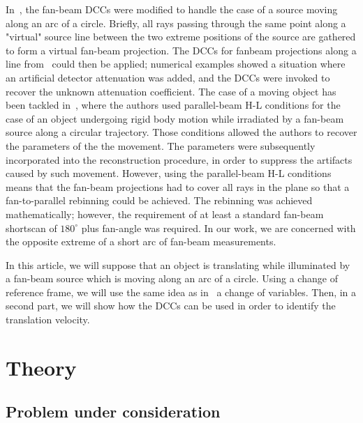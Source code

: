 \documentclass[twocolumn]{IEEEtran}
\begin{document}
In~\cite{clackdoyle2015consistency}, the fan-beam DCCs were modified to handle the case of a source moving along an arc of a circle. Briefly, all rays passing through the same point along a "virtual" source line between the two extreme positions of the source are gathered to form a virtual fan-beam projection. The DCCs for fanbeam projections along a line from~\cite{clackdoyle2013necessary} could then be applied; numerical examples showed a situation where an artificial detector attenuation was added, and the DCCs were invoked to recover the unknown attenuation coefficient. The case of a moving object has been tackled in~\cite{yu2006data,yu2007data}, where the authors used parallel-beam H-L conditions for the case of an object undergoing rigid body motion while irradiated by a fan-beam source along a circular trajectory. Those conditions allowed the authors to recover the parameters of the the movement. The parameters were subsequently incorporated into the reconstruction procedure, in order to suppress the artifacts caused by such movement.  However, using the parallel-beam H-L conditions means that the fan-beam projections had to cover all rays in the plane so that a fan-to-parallel rebinning could be achieved. The rebinning was achieved mathematically; however, the requirement of at least a standard fan-beam shortscan of $180^{\circ}$ plus fan-angle was required. In our work, we are concerned with the opposite extreme of a short arc of fan-beam measurements.

In this article, we will suppose that an object is translating while illuminated by a fan-beam source which is moving along an arc of a circle. Using a change of reference frame, we will use the same idea as in~\cite{clackdoyle2015consistency} a change of variables. Then, in a second part, we will show how the DCCs can be used in order to identify the translation velocity.

\section{Theory} 
\label{sec:theory}

\subsection{Problem under consideration}
\label{sub:problem_under_consideration}
\end{document}
